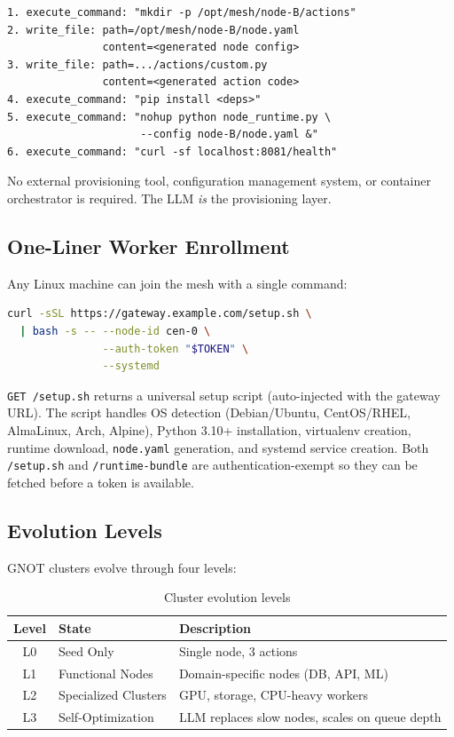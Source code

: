 \documentclass[10pt,twocolumn]{article}
\begin{document}
\begin{lstlisting}[caption={LLM-orchestrated node bootstrap sequence}]
1. execute_command: "mkdir -p /opt/mesh/node-B/actions"
2. write_file: path=/opt/mesh/node-B/node.yaml
               content=<generated node config>
3. write_file: path=.../actions/custom.py
               content=<generated action code>
4. execute_command: "pip install <deps>"
5. execute_command: "nohup python node_runtime.py \
                     --config node-B/node.yaml &"
6. execute_command: "curl -sf localhost:8081/health"
\end{lstlisting}

No external provisioning tool, configuration management system, or
container orchestrator is required. The LLM \emph{is} the provisioning
layer.

\subsection{One-Liner Worker Enrollment}

Any Linux machine can join the mesh with a single command:

\begin{lstlisting}[language=bash]
curl -sSL https://gateway.example.com/setup.sh \
  | bash -s -- --node-id cen-0 \
               --auth-token "$TOKEN" \
               --systemd
\end{lstlisting}

\texttt{GET /setup.sh} returns a universal setup script (auto-injected
with the gateway URL). The script handles OS detection (Debian/Ubuntu,
CentOS/RHEL, AlmaLinux, Arch, Alpine), Python 3.10+ installation,
virtualenv creation, runtime download, \texttt{node.yaml} generation,
and systemd service creation. Both \texttt{/setup.sh} and
\texttt{/runtime-bundle} are authentication-exempt so they can be
fetched before a token is available.

\subsection{Evolution Levels}

GNOT clusters evolve through four levels:

\begin{table}[h]
\centering
\caption{Cluster evolution levels}
\label{tab:evolution}
\small
\begin{tabular}{@{}clp{4.0cm}@{}}
\toprule
\textbf{Level} & \textbf{State} & \textbf{Description} \\
\midrule
L0 & Seed Only & Single node, 3 actions \\
L1 & Functional Nodes & Domain-specific nodes (DB, API, ML) \\
L2 & Specialized Clusters & GPU, storage, CPU-heavy workers \\
L3 & Self-Optimization & LLM replaces slow nodes, scales on queue depth \\
\bottomrule
\end{tabular}
\end{table}
\end{document}
